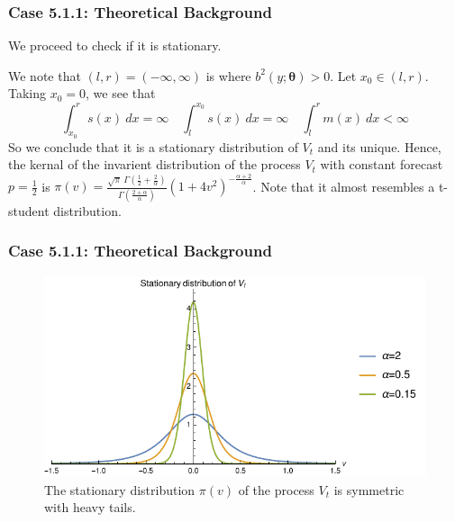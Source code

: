 \documentclass[aspectratio=169]{beamer}\usepackage[utf8]{inputenc}
\begin{document}
\begin{frame}\frametitle{ Case 5.1.1: Theoretical Background }
We proceed to check if it is stationary. 

We note that $(l,r) = (-\infty, \infty)$ is where $b^2 (y; \bm{\theta} ) >0$. Let $x_0 \in (l,r)$. Taking $x_0=0$, we see that
\begin{equation}
\int_{x_0}^r s(x) \ dx = \infty \quad \int_{l}^{x_0} s(x) \ dx = \infty \quad \int_l^r m(x) \ dx < \infty
\end{equation}
So we conclude that it is a stationary distribution of $V_t$ and its unique.
Hence, the kernal of the invarient distribution of the process $V_t$ with constant forecast $p=\frac{1}{2}$ is $\pi(v)= \frac{\sqrt{\pi} \  \Gamma (\frac{1}{2}+ \frac{2}{\alpha})}{\Gamma(\frac{2+\alpha}{\alpha})}\left(1+4 v^2\right)^{-\frac{\alpha +2}{\alpha }}$. Note that it almost resembles a t-student distribution.
\end{frame}



\begin{frame}\frametitle{ Case 5.1.1: Theoretical Background }


\begin{figure}
    \includegraphics[scale=0.9]{Figures/invarient_Vt.pdf}
  \caption{ The stationary distribution $\pi(v)$ of the process $V_t$ is symmetric with heavy tails.}
\end{figure}

\end{frame}
\end{document}
